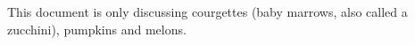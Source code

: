 \documentclass[12pt]{article}
\begin{document}
 This document is only discussing \glspl{courgette} (baby \glspl{marrow}, also called a \gls{zucchini}), \glspl{pumpkin} and \glspl{melon}.
\printunsrtglossaries 
\end{document}
